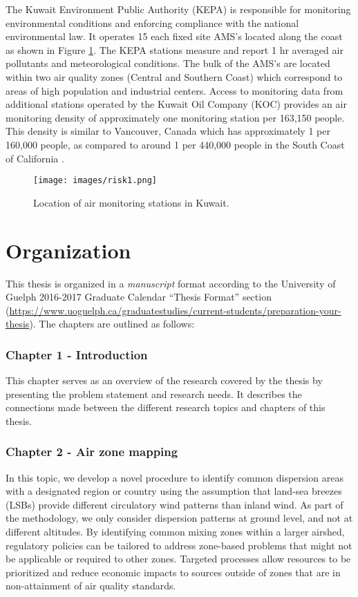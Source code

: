 The Kuwait Environment Public Authority (KEPA) is responsible for monitoring environmental conditions and enforcing compliance with the national environmental law. It operates 15 each fixed site AMS's located along the coast as shown in Figure \ref{fig1:amskuwait}.  The KEPA stations measure and report 1 hr averaged air pollutants and meteorological conditions. The bulk of the AMS's are located within two air quality zones (Central and Southern Coast) which correspond to areas of high population and industrial centers. Access to monitoring data from additional stations operated by the Kuwait Oil Company (KOC) provides an air monitoring density of approximately one monitoring station per 163,150 people. This density is similar to Vancouver, Canada which has approximately 1 per 160,000 people, as compared to around 1 per 440,000 people in the South Coast of California \citep{Marshall2008}.

%  
\begin{figure}[H]
\centering
\texttt{[image: images/risk1.png]} 
\caption{Location of air monitoring stations in Kuwait.}
\label{fig1:amskuwait}
\end{figure}

\section{Organization}

This thesis is organized in a \textit{manuscript} format according to the University of Guelph 2016-2017 Graduate Calendar ``Thesis Format'' section (\url{https://www.uoguelph.ca/graduatestudies/current-students/preparation-your-thesis}).  The chapters are outlined as follows:

\subsubsection*{Chapter 1 - Introduction}

This chapter serves as an overview of the research covered by the thesis by presenting the problem statement and research needs. It describes the connections made between the different research topics and chapters of this thesis.

\subsubsection*{Chapter 2 - Air zone mapping}

In this topic, we develop a novel procedure to identify common dispersion areas with a designated region or country using the assumption that land-sea breezes (LSBs) provide different circulatory wind patterns than inland wind. As part of the methodology, we only consider dispersion patterns at ground level, and not at different altitudes. By identifying common mixing zones within a larger airshed, regulatory policies can be tailored to address zone-based problems that might not be applicable or required to other zones. Targeted processes allow resources to be prioritized and reduce economic impacts to sources outside of zones that are in non-attainment of air quality standards.

